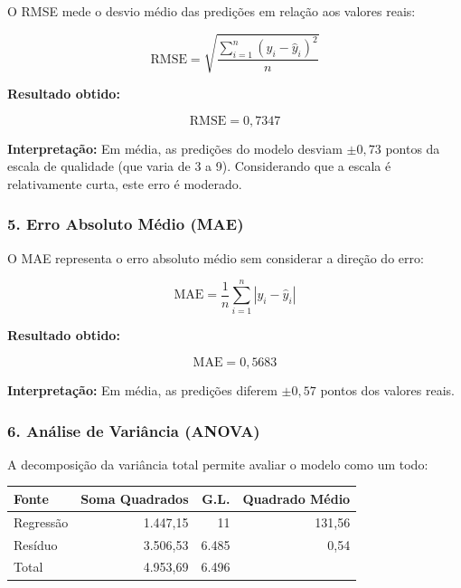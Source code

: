 \documentclass[12pt,a4paper]{article}
\begin{document}
O RMSE mede o desvio médio das predições em relação aos valores reais:

\begin{equation}
\text{RMSE} = \sqrt{\frac{\sum_{i=1}^{n} (y_i - \hat{y}_i)^2}{n}}
\end{equation}

\textbf{Resultado obtido:}

\begin{equation}
\text{RMSE} = 0,7347
\end{equation}

\textbf{Interpretação:} Em média, as predições do modelo desviam $\pm 0,73$ pontos da escala de qualidade (que varia de 3 a 9). Considerando que a escala é relativamente curta, este erro é moderado.

\subsubsection*{5. Erro Absoluto Médio (MAE)}

O MAE representa o erro absoluto médio sem considerar a direção do erro:

\begin{equation}
\text{MAE} = \frac{1}{n} \sum_{i=1}^{n} |y_i - \hat{y}_i|
\end{equation}

\textbf{Resultado obtido:}

\begin{equation}
\text{MAE} = 0,5683
\end{equation}

\textbf{Interpretação:} Em média, as predições diferem $\pm 0,57$ pontos dos valores reais.

\subsubsection*{6. Análise de Variância (ANOVA)}

A decomposição da variância total permite avaliar o modelo como um todo:

\begin{center}
\begin{tabular}{|l|r|r|r|}
\hline
\textbf{Fonte} & \textbf{Soma Quadrados} & \textbf{G.L.} & \textbf{Quadrado Médio} \\
\hline
Regressão & 1.447,15 & 11 & 131,56 \\
Resíduo & 3.506,53 & 6.485 & 0,54 \\
Total & 4.953,69 & 6.496 &  \\
\hline
\end{tabular}
\end{center}
\end{document}

